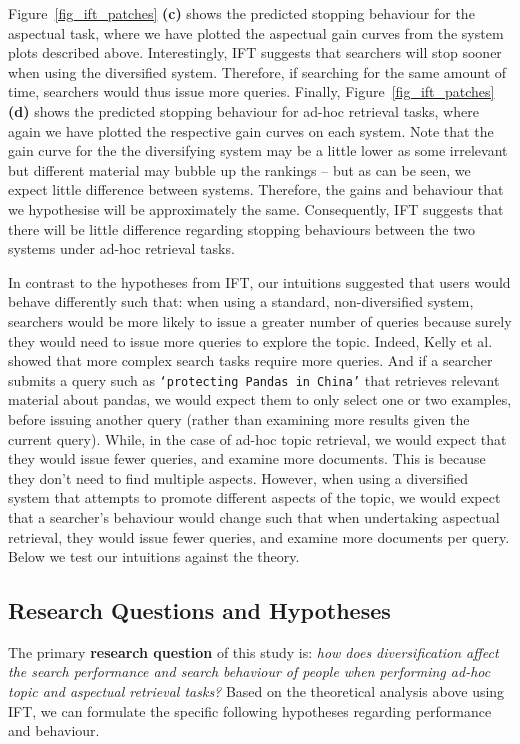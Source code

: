 Figure~\ref{fig_ift_patches} \textbf{(c)} shows the predicted stopping behaviour for the aspectual task, where we have plotted the aspectual gain curves from the system plots described above. Interestingly, IFT suggests that searchers will stop sooner when using the diversified system. Therefore, if searching for the same amount of time, searchers would thus issue more queries. Finally, Figure~\ref{fig_ift_patches} \textbf{(d)} shows the predicted stopping behaviour for ad-hoc retrieval tasks, where again we have plotted the respective gain curves on each system. Note that the gain curve for the the diversifying system may be a little lower as some irrelevant but different material may bubble up the rankings -- but as can be seen, we expect little difference between systems. Therefore, the gains and behaviour that we hypothesise will be approximately the same. Consequently, IFT suggests that there will be little difference regarding stopping behaviours between the two systems under ad-hoc retrieval tasks.

In contrast to the hypotheses from IFT, our intuitions suggested that users would behave differently such that: when using a standard, non-diversified system, searchers would be more likely to issue a greater number of queries because surely they would need to issue more queries to explore the topic. Indeed, Kelly et al.~\cite{kelly2015search_tasks} showed that more complex search tasks require more queries. And if a searcher submits a query such as \texttt{`protecting Pandas in China'} that retrieves relevant material about pandas, we would expect them to only select one or two examples, before issuing another query (rather than examining more results given the current query). While, in the case of ad-hoc topic retrieval, we would expect that they would issue fewer queries, and examine more documents. This is because they don't need to find multiple aspects. However, when using a diversified system that attempts to promote different aspects of the topic, we would expect that a searcher's behaviour would change such that when undertaking aspectual retrieval, they would issue fewer queries, and examine more documents per query. Below we test our intuitions against the theory.

\subsection{Research Questions and Hypotheses} \label{sec:questions}
The primary \textbf{research question} of this study is: {\it how does diversification affect the search performance and search behaviour of people when performing ad-hoc topic and aspectual retrieval tasks?} Based on the theoretical analysis above using IFT, we can formulate the specific following hypotheses regarding performance and behaviour.

